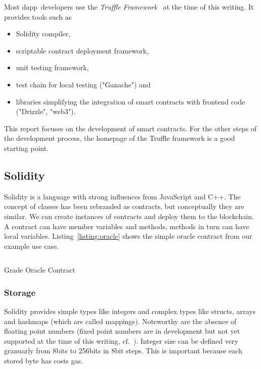Most \ac{dapp} developers use the \emph{Truffle Framework}~\cite{Truffle} at the time of this writing.
It provides tools such as

\begin{itemize}
    \item Solidity compiler,
    \item scriptable contract deployment framework,
    \item unit testing framework,
    \item test chain for local testing ("Ganache") and
    \item libraries simplifying the integration of smart contracts with frontend code ("Drizzle", "web3").
\end{itemize}

This report focuses on the development of smart contracts.
For the other steps of the development process, the homepage of the Truffle framework is a good starting point.

\subsection{Solidity}

Solidity is a language with strong influences from JavaScript and C++.
The concept of classes has been rebranded as contracts,
but conceptually they are similar. We can create instances of contracts and deploy them
to the blockchain. A contract can have member variables and methods, methods in turn can
have local variables.
Listing~\ref{listing:oracle} shows the simple oracle contract from our example use case.

\begin{listing}[]
\inputminted[breaklines,fontsize=\footnotesize]{solidity}{TUMOracle.sol}
\caption{Grade Oracle Contract}
\label{listing:oracle}
\end{listing}

\subsubsection{Storage}

Solidity provides simple types like integers and complex types like structs, arrays and
hashmaps (which are called mappings). Noteworthy are the absence of floating point numbers
(fixed point numbers are in development but not yet supported at the time of this writing, cf.\ \cite{SolidityTypes}).
Integer size can be defined very granuarly from 8bits to 256bits in 8bit steps.
This is important because each stored byte has costs gas.

